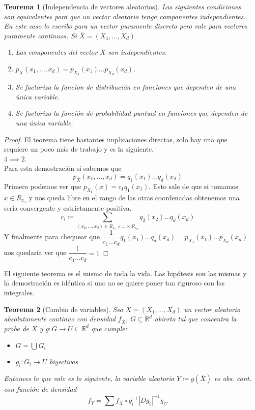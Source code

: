 \documentclass[11pt]{article}
\theoremstyle{plain} %
\newtheorem{teorema}{\color{rojo}Teorema}
\theoremstyle{definition}
\theoremstyle{remark}
\def\R{\mathbb{R}}
\def\va{variable aleatoria }
\newcommand{\X}{\overline{X}}
\begin{document}
\begin{teorema}
	[Independencia de vectores aleatorios]
	Las siguientes condiciones son equivalentes para que un vector aleatorio tenga componentes independientes. En este caso lo escribo para un vector puramente discreto pero vale para vectores puramente continuos. Si $\overline{X} = \left( X_1, \dots , X_d \right)$
	\begin{enumerate}
		\item Las componentes del vector $\X$ son independientes.
		\item $p_{\X} (x_1,\dots,x_d) = p_{X_1}(x_1) \dots p_{X_d}(x_d)$.
		\item  Se factoriza la funcion de distribuci\'on en funciones que dependen de una \'unica variable.
		\item Se factoriza la funci\'on de probabilidad puntual en funciones que dependen de una \'unica variable.
		
	\end{enumerate}
\end{teorema}

\begin{proof}
	El teorema tiene bastantes implicaciones directas, solo hay una que requiere un poco m\'as de trabajo y es la siguiente.\\
	$4 \implies 2$.\\
	Para esta demostraci\'on si sabemos que 
	\[p_{\X} (x_1,\dots,x_d) = q_{1}(x_1) \dots q_{d}(x_d)\]
	Primero podemos ver que $p_{X_1}(x) = c_{1}q_{1}(x_1)$. Esto sale de que si tomamos $x \in R_{x_1}$ y nos queda libre en el rango de las otras coordenadas obtenemos una seria convergente y estrictamente positiva.
	\[c_i \coloneqq \sum_{(x_2, \dots, x_d) \in R_{x_1} \times \dots \times R_{x_d}} q_{2}(x_2) \dots q_{d}(x_d)  \]
	Y finalmente para chequear  que $\dfrac{1}{c_1\dots c_d}q_{1}(x_1) \dots q_{d}(x_d) = p_{X_{1}}(x_1) \dots p_{X_d}(x_d)$ nos quedar\'ia ver que $\dfrac{1}{c_1\dots c_d}=1$ 
\end{proof}

El siguiente teorema es el mismo de toda la vida. Las hipótesis son las mismas y la demostración es idéntica si uno no se quiere poner tan riguroso con las integrales.

\begin{teorema}
	[Cambio de variables]
	Sea $\overline{X} = \left( X_1, \dots , X_d \right)$ un vector aleatorio absolutamente continuo con densidad $f_{\overline{X}}$, $G \subseteq \R^d$ abierto tal que concentra la proba de $\overline{X}$ y $g:G \to U \subseteq \R^d$ que cumple:
	\begin{itemize}
		\item $G = \dot{\bigcup} G_i$
		\item  $g_{i}:G_{i} \to U$ biyectivas
	\end{itemize}
	Entonces lo que vale es lo siguiente, la \va $Y \coloneqq g(\overline{X})$ es abs. cont. con función de densidad
	\[f_Y = \sum f_{\overline{X}} \circ g_{i} ^{-1} |Dg_i|^{-1} \chi_U \]
\end{teorema}
\end{document}
